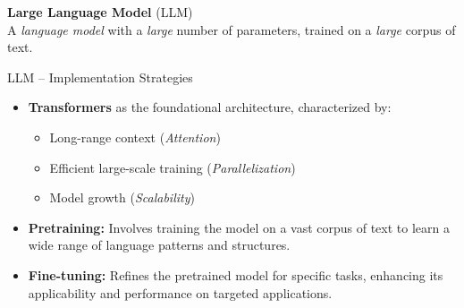 \documentclass[presentation, 10pt]{beamer}\mode<presentation>{\usetheme{AMSBolognaFC}}
\begin{document}
\begin{frame}[plain]
	\huge{
		\textbf{Large Language Model} (LLM)
	}\\[1em]
	\large{
		{A \emph{language model} with a \emph{large} number of parameters, trained on a \emph{large} corpus of text.}
	}
\end{frame}

\begin{frame}{LLM -- Implementation Strategies}
    \begin{itemize}
        \item \textbf{Transformers} as the foundational architecture, characterized by:
        \begin{itemize}
            \item Long-range context (\emph{Attention})
            \item Efficient large-scale training (\emph{Parallelization})
            \item Model growth (\emph{Scalability})
        \end{itemize}
        \item \textbf{Pretraining:} Involves training the model on a vast corpus of text to learn a wide range of language patterns and structures.
        \item \textbf{Fine-tuning:} Refines the pretrained model for specific tasks, enhancing its applicability and performance on targeted applications.
    \end{itemize}
\end{frame}
\end{document}

